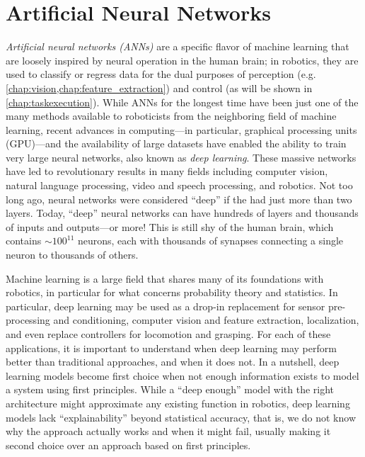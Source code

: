 \chapter{Artificial Neural Networks}\label{chap:ann}

\textsl{Artificial neural networks (ANNs)} are a specific flavor of machine learning that are loosely inspired by neural operation in the human brain; in robotics, they are used to classify or regress data for the dual purposes of perception (e.g. \cref{chap:vision,chap:feature_extraction}) and control (as will be shown in \cref{chap:taskexecution}).
%
While ANNs for the longest time have been just one of the many methods available to roboticists from the neighboring field of machine learning, recent advances in computing---in particular, graphical processing units (GPU)---and the availability of large datasets have enabled the ability to train very large neural networks, also known as \textsl{deep learning}. These massive networks have led to revolutionary results in many fields including computer vision, natural language processing, video and speech processing, and robotics.
%
Not too long ago, neural networks were considered ``deep'' if the had just more than two layers. Today, ``deep'' neural networks can have hundreds of layers and thousands of inputs and outputs---or more!
This is still shy of the human brain, which contains $\sim 100^{11}$ neurons, each with thousands of synapses connecting a single neuron to thousands of others.

Machine learning is a large field that shares many of its foundations with robotics, in particular for what concerns probability theory and statistics. In particular, deep learning may be used as a drop-in replacement for sensor pre-processing and conditioning, computer vision and feature extraction, localization, and even replace controllers for locomotion and grasping.
For each of these applications, it is important to understand when deep learning may perform better than traditional approaches, and when it does not.
In a nutshell, deep learning models become first choice when not enough information exists to model a system using first principles. While a ``deep enough'' model with the right architecture might approximate any existing function in robotics, deep learning models lack ``explainability'' beyond statistical accuracy, that is, we do not know why the approach actually works and when it might fail, usually making it second choice over an approach based on first principles.

